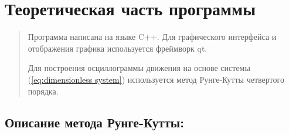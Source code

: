 \section{Теоретическая часть программы}

\begin{quotation}
Программа написана на языке C++. Для графического интерфейса и отображения графика используется фреймворк qt.

Для построения осциллограммы движения на основе системы (\ref{eq:dimensionless system}) используется метод Рунге-Кутты четвертого порядка.
\end{quotation}

\subsection*{Описание метода Рунге-Кутты:}

